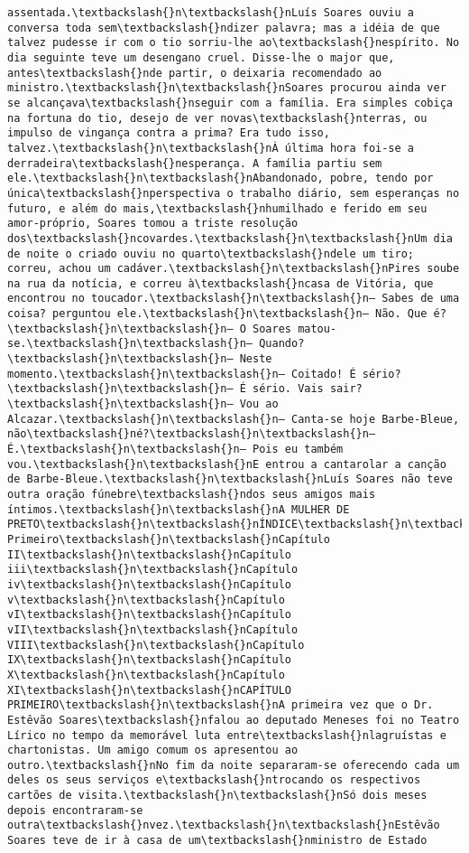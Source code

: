 \begin{Verbatim}[commandchars=\\\{\}]
assentada.\textbackslash{}n\textbackslash{}nLuís Soares ouviu a conversa toda sem\textbackslash{}ndizer palavra; mas a idéia de que talvez pudesse ir com o tio sorriu-lhe ao\textbackslash{}nespírito. No dia seguinte teve um desengano cruel. Disse-lhe o major que, antes\textbackslash{}nde partir, o deixaria recomendado ao ministro.\textbackslash{}n\textbackslash{}nSoares procurou ainda ver se alcançava\textbackslash{}nseguir com a família. Era simples cobiça na fortuna do tio, desejo de ver novas\textbackslash{}nterras, ou impulso de vingança contra a prima? Era tudo isso, talvez.\textbackslash{}n\textbackslash{}nÀ última hora foi-se a derradeira\textbackslash{}nesperança. A família partiu sem ele.\textbackslash{}n\textbackslash{}nAbandonado, pobre, tendo por única\textbackslash{}nperspectiva o trabalho diário, sem esperanças no futuro, e além do mais,\textbackslash{}nhumilhado e ferido em seu amor-próprio, Soares tomou a triste resolução dos\textbackslash{}ncovardes.\textbackslash{}n\textbackslash{}nUm dia de noite o criado ouviu no quarto\textbackslash{}ndele um tiro; correu, achou um cadáver.\textbackslash{}n\textbackslash{}nPires soube na rua da notícia, e correu à\textbackslash{}ncasa de Vitória, que encontrou no toucador.\textbackslash{}n\textbackslash{}n— Sabes de uma coisa? perguntou ele.\textbackslash{}n\textbackslash{}n— Não. Que é?\textbackslash{}n\textbackslash{}n— O Soares matou-se.\textbackslash{}n\textbackslash{}n— Quando?\textbackslash{}n\textbackslash{}n— Neste momento.\textbackslash{}n\textbackslash{}n— Coitado! É sério?\textbackslash{}n\textbackslash{}n— É sério. Vais sair?\textbackslash{}n\textbackslash{}n— Vou ao Alcazar.\textbackslash{}n\textbackslash{}n— Canta-se hoje Barbe-Bleue, não\textbackslash{}né?\textbackslash{}n\textbackslash{}n— É.\textbackslash{}n\textbackslash{}n— Pois eu também vou.\textbackslash{}n\textbackslash{}nE entrou a cantarolar a canção de Barbe-Bleue.\textbackslash{}n\textbackslash{}nLuís Soares não teve outra oração fúnebre\textbackslash{}ndos seus amigos mais íntimos.\textbackslash{}n\textbackslash{}nA MULHER DE PRETO\textbackslash{}n\textbackslash{}nÍNDICE\textbackslash{}n\textbackslash{}nCapítulo Primeiro\textbackslash{}n\textbackslash{}nCapítulo II\textbackslash{}n\textbackslash{}nCapítulo iii\textbackslash{}n\textbackslash{}nCapítulo iv\textbackslash{}n\textbackslash{}nCapítulo v\textbackslash{}n\textbackslash{}nCapítulo vI\textbackslash{}n\textbackslash{}nCapítulo vII\textbackslash{}n\textbackslash{}nCapítulo VIII\textbackslash{}n\textbackslash{}nCapítulo IX\textbackslash{}n\textbackslash{}nCapítulo X\textbackslash{}n\textbackslash{}nCapítulo XI\textbackslash{}n\textbackslash{}nCAPÍTULO PRIMEIRO\textbackslash{}n\textbackslash{}nA primeira vez que o Dr. Estêvão Soares\textbackslash{}nfalou ao deputado Meneses foi no Teatro Lírico no tempo da memorável luta entre\textbackslash{}nlagruístas e chartonistas. Um amigo comum os apresentou ao outro.\textbackslash{}nNo fim da noite separaram-se oferecendo cada um deles os seus serviços e\textbackslash{}ntrocando os respectivos cartões de visita.\textbackslash{}n\textbackslash{}nSó dois meses depois encontraram-se outra\textbackslash{}nvez.\textbackslash{}n\textbackslash{}nEstêvão Soares teve de ir à casa de um\textbackslash{}nministro de Estado 
\end{Verbatim}
